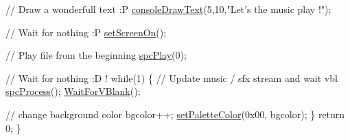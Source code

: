\begin{DoxyCodeInclude}
    \textcolor{comment}{// Draw a wonderfull text :P}
    \hyperlink{a00320_a7e52d15b5a1befa42f5758de19dfb70c}{consoleDrawText}(5,10,\textcolor{stringliteral}{"Let's the music play !"});

    \textcolor{comment}{// Wait for nothing :P}
    \hyperlink{a00353_abc7d4ef8ebc22f5b710927909bb3f144}{setScreenOn}();  

    \textcolor{comment}{// Play file from the beginning}
    \hyperlink{a00347_aebf91de1df5e4fa83454a84bb0e60918}{spcPlay}(0);

    \textcolor{comment}{// Wait for nothing :D !}
    \textcolor{keywordflow}{while}(1) \{
        \textcolor{comment}{// Update music / sfx stream and wait vbl}
        \hyperlink{a00347_acab7d87110bac6baa9d74ab314772c98}{spcProcess}();
        \hyperlink{a00326_a815e2626bd26d0e936d507a363ecd723}{WaitForVBlank}();
        
        \textcolor{comment}{// change background color}
        bgcolor++;
        \hyperlink{a00353_a549263481ac687a7e1d6f6cd5bd85d29}{setPaletteColor}(0x00, bgcolor);
    \}
    \textcolor{keywordflow}{return} 0;
\}
\end{DoxyCodeInclude}
 